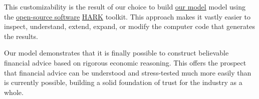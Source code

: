 \documentclass{article}
\begin{document}
This customizability is the result of our choice to build \href{https://github.com/econ-ark/life-cycle-prime-time}{our model} model using the \href{https://en.wikipedia.org/wiki/Open-source\_software}{open-source software} \href{https://docs.econ-ark.org}{HARK} toolkit. This approach makes it vastly easier to inspect, understand, extend, expand, or modify the computer code that generates the results.

Our model demonstrates that it is finally possible to construct believable financial advice based on rigorous economic reasoning. This offers the prospect that financial advice can be understood and stress-tested much more easily than is currently possible, building a solid foundation of trust for the industry as a whole.
\end{document}

